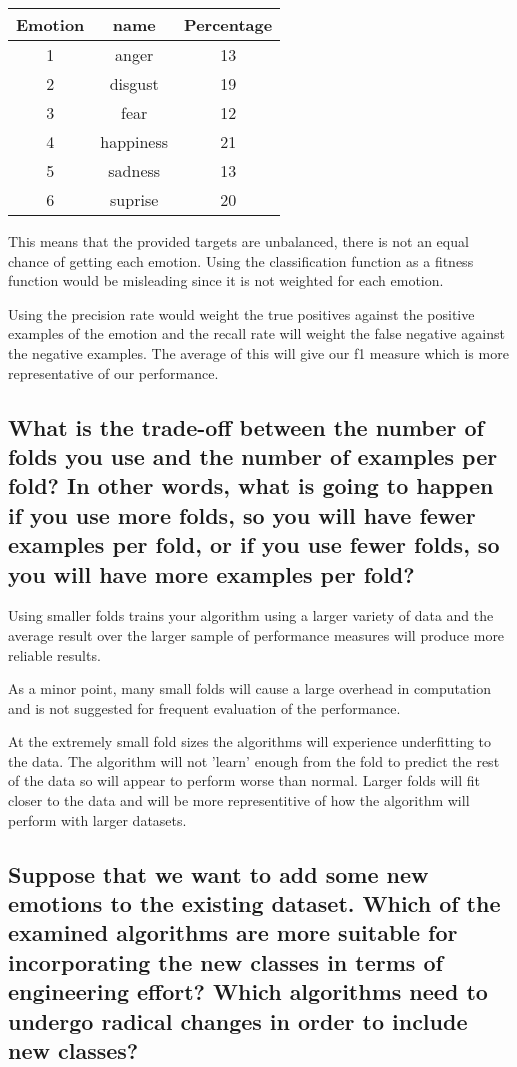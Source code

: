 \documentclass[11pt]{article}
\begin{document}
\begin{tabular}{c c c} %
\hline\hline %
Emotion & name & Percentage\\ [0.5ex] %
\hline %
1 & anger     & 13 \\ %
2 & disgust   & 19 \\
3 & fear      & 12 \\
4 & happiness & 21 \\
5 & sadness   & 13 \\ 
6 & suprise   & 20 \\ [1ex] %
\hline %
\end{tabular}

This means that the provided targets are unbalanced, there is not an equal chance of getting each emotion. Using the classification function as a fitness function would be misleading since it is not weighted for each emotion.

Using the precision rate would weight the true positives against the positive examples of the emotion and the recall rate will weight the false negative against the negative examples. The average of this will give our f1 measure which is more representative of our performance. 

\subsection{What is the trade-off between the number of folds you use and the number of examples per fold? In other words, what is going to happen if you use more folds, so you will have fewer examples per fold, or if you use fewer folds, so you will have more examples per fold?}

Using smaller folds trains your algorithm using a larger variety of data and the average result over the larger sample of performance measures will produce more reliable results.

As a minor point, many small folds will cause a large overhead in computation and is not suggested for frequent evaluation of the performance. 

At the extremely small fold sizes the algorithms will experience underfitting to the data. The algorithm will not 'learn' enough from the fold to predict the rest of the data so will appear to perform worse than normal. Larger folds will fit closer to the data and will be more representitive of how the algorithm will perform with larger datasets. 

\subsection{Suppose that we want to add some new emotions to the existing dataset. Which of the examined algorithms are more suitable for incorporating the new classes in terms of engineering effort? Which algorithms need to undergo radical changes in order to include new classes?}
\end{document}

